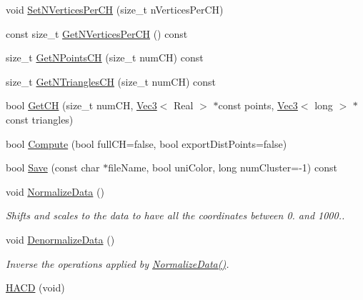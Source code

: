 \begin{DoxyCompactItemize}
\item 
void \hyperlink{class_h_a_c_d_1_1_h_a_c_d_a10505ead4864d427da45181dca102d0e}{Set\+N\+Vertices\+Per\+C\+H} (size\+\_\+t n\+Vertices\+Per\+C\+H)
\item 
const size\+\_\+t \hyperlink{class_h_a_c_d_1_1_h_a_c_d_a29daec6aafc138ea09b54c39d15a6bcf}{Get\+N\+Vertices\+Per\+C\+H} () const 
\item 
size\+\_\+t \hyperlink{class_h_a_c_d_1_1_h_a_c_d_a06fb62f6e5f20c95d75f32424affcfac}{Get\+N\+Points\+C\+H} (size\+\_\+t num\+C\+H) const 
\item 
size\+\_\+t \hyperlink{class_h_a_c_d_1_1_h_a_c_d_a2d84cf35a49d0b83269e2d84f3cffbbc}{Get\+N\+Triangles\+C\+H} (size\+\_\+t num\+C\+H) const 
\item 
bool \hyperlink{class_h_a_c_d_1_1_h_a_c_d_aa6ab81c287c06641c7d3fbbf7df51160}{Get\+C\+H} (size\+\_\+t num\+C\+H, \hyperlink{class_h_a_c_d_1_1_vec3}{Vec3}$<$ Real $>$ $\ast$const points, \hyperlink{class_h_a_c_d_1_1_vec3}{Vec3}$<$ long $>$ $\ast$const triangles)
\item 
bool \hyperlink{class_h_a_c_d_1_1_h_a_c_d_a161560c4e73cf46541984f0ab6c27b0b}{Compute} (bool full\+C\+H=false, bool export\+Dist\+Points=false)
\item 
bool \hyperlink{class_h_a_c_d_1_1_h_a_c_d_af7f33db238235e1238b5b8d5c831a988}{Save} (const char $\ast$file\+Name, bool uni\+Color, long num\+Cluster=-\/1) const 
\item 
\hypertarget{class_h_a_c_d_1_1_h_a_c_d_a240747f650bde48307934e084563bed3}{void \hyperlink{class_h_a_c_d_1_1_h_a_c_d_a240747f650bde48307934e084563bed3}{Normalize\+Data} ()}\label{class_h_a_c_d_1_1_h_a_c_d_a240747f650bde48307934e084563bed3}

\begin{DoxyCompactList}\small\item\em Shifts and scales to the data to have all the coordinates between 0. and 1000.. \end{DoxyCompactList}\item 
\hypertarget{class_h_a_c_d_1_1_h_a_c_d_a053c66915edd6f3ddc333b1e57c5dbb3}{void \hyperlink{class_h_a_c_d_1_1_h_a_c_d_a053c66915edd6f3ddc333b1e57c5dbb3}{Denormalize\+Data} ()}\label{class_h_a_c_d_1_1_h_a_c_d_a053c66915edd6f3ddc333b1e57c5dbb3}

\begin{DoxyCompactList}\small\item\em Inverse the operations applied by \hyperlink{class_h_a_c_d_1_1_h_a_c_d_a240747f650bde48307934e084563bed3}{Normalize\+Data()}. \end{DoxyCompactList}\item 
\hypertarget{class_h_a_c_d_1_1_h_a_c_d_a8b8afc4c214d7fef80765c7b3a1ee973}{\hyperlink{class_h_a_c_d_1_1_h_a_c_d_a8b8afc4c214d7fef80765c7b3a1ee973}{H\+A\+C\+D} (void)}\label{class_h_a_c_d_1_1_h_a_c_d_a8b8afc4c214d7fef80765c7b3a1ee973}


\end{DoxyCompactItemize}

